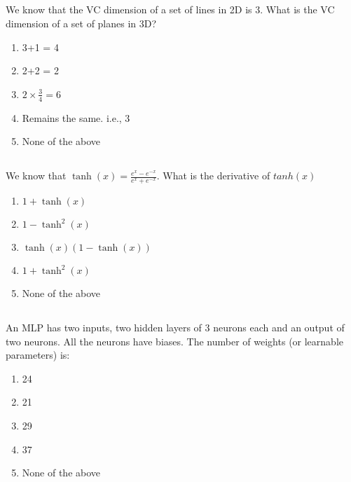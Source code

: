 \begin{frame}
\section{}
We know that the VC dimension of a set of lines in 2D is 3. What is the VC dimension of a set of planes in 3D?
\begin{enumerate}[label=(\Alph*)]
\item 3+1 = 4   %
\item 2+2 = 2
\item $2 \times \frac{3}{4} = 6$
\item Remains the same. i.e., 3
\item None of the above   %
\end{enumerate}
\end{frame}

\begin{frame}
\section{}
We know that $\tanh(x) = \frac{e^x - e^{-x}}{e^x + e^{-x}}$. What is the derivative of $tanh(x)$
\begin{enumerate}[label=(\Alph*)]
\item $1+\tanh(x)$
\item $1- \tanh^2(x)$   %
\item $\tanh(x)(1-\tanh(x))$
\item $1+\tanh^2(x)$
\item None of the above   %
\end{enumerate}
\end{frame}

\begin{frame}
\section{}
An MLP has two inputs, two hidden layers of 3 neurons each and an output of two neurons. All the neurons have biases. The number of weights (or learnable parameters) is:

\begin{enumerate}[label=(\Alph*)]
\item 24
\item 21
\item 29    %
\item 37
\item None of the above  %
\end{enumerate}
\end{frame}



